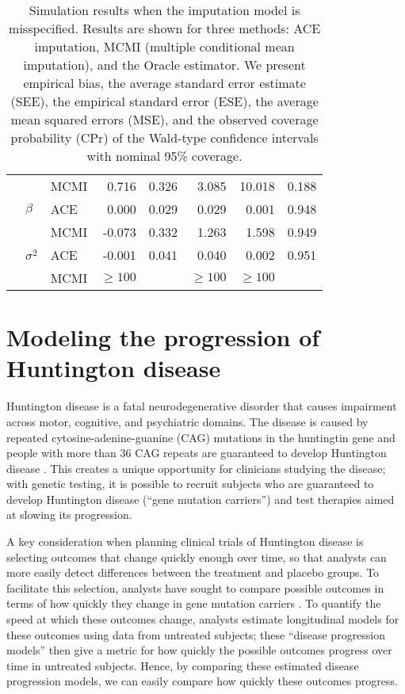\documentclass[12pt]{article}
\begin{document}
\begin{table}[!ht]
\begin{tabular}{lllrrrrr}
   &  & MCMI & 0.716 & 0.326 & 3.085 & 10.018 & 0.188 \\
   & $\beta$ & ACE & 0.000 & 0.029 & 0.029 & 0.001 & 0.948 \\ 
   &  & MCMI & -0.073 & 0.332 & 1.263 & 1.598 & 0.949 \\ 
   & $\sigma^2$ & ACE & -0.001 & 0.041 & 0.040 & 0.002 & 0.951 \\ 
   &  & MCMI & $\geq 100$ &  & $\geq 100$ & $\geq 100$ &  \\ 
   \hline
\end{tabular}
\caption{Simulation results when the imputation model is misspecified. Results are shown for three methods: ACE imputation, %
MCMI (multiple conditional mean imputation), and the Oracle estimator. We present empirical bias, the average standard error estimate (SEE), the empirical standard error (ESE), the average mean squared errors (MSE), and the observed coverage probability (CPr) of the Wald-type confidence intervals with nominal 95\% coverage.}
\label{table:mis_spec_results}
\end{table}

\section{Modeling the progression of Huntington disease}
\label{sec:real_data_analysis}

Huntington disease is a fatal neurodegenerative disorder that causes impairment across motor, cognitive, and psychiatric domains. The disease is caused by repeated cytosine-adenine-guanine (CAG) mutations in the huntingtin gene and people with more than 36 CAG repeats are guaranteed to develop Huntington disease \citep{mccolgan2018huntington}. This creates a unique opportunity for clinicians studying the disease; with genetic testing, it is possible to recruit subjects who are guaranteed to develop Huntington disease (``gene mutation carriers'') and test therapies aimed at slowing its progression.

A key consideration when planning clinical trials of Huntington disease is selecting outcomes that change quickly enough over time, so that analysts can more easily detect differences between the treatment and placebo groups. To facilitate this selection, analysts have sought to compare possible outcomes in terms of how quickly they change in gene mutation carriers \citep{langbehn2020clinical, paulsen2014clinical}. To quantify the speed at which these outcomes change, analysts estimate longitudinal models for these outcomes using data from untreated subjects; these ``disease progression models'' then give a metric for how quickly the possible outcomes progress over time in untreated subjects. Hence, by comparing these estimated disease progression models, we can easily compare how quickly these outcomes progress.
\end{document}
